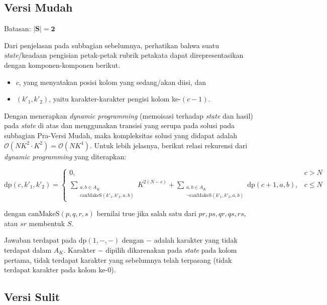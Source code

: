 \documentclass[../main_editorial.tex]{subfiles} %
\newcommand{\dpf}{\mathrm{dp}}
\newcommand{\mtrue}{\mathrm{true}}
\newcommand{\bigO}[1]{\mathcal{O}(#1)}
\begin{document}
\subsection*{Versi Mudah}
Batasan: $\mathbf{|S| = 2}$

Dari penjelasan pada subbagian sebelumnya, perhatikan bahwa suatu \textit{state}/keadaan pengisian petak-petak rubrik petakata dapat direpresentasikan dengan komponen-komponen berikut.

\begin{itemize}
\item $ c $, yang menyatakan posisi kolom yang sedang/akan diisi, dan
\item $ (k'_1, k'_2) $, yaitu karakter-karakter pengisi kolom ke-$ (c-1) $.
\end{itemize}

Dengan menerapkan \textit{dynamic programming} (memoisasi terhadap \textit{state} dan hasil) pada \textit{state} di atas dan menggunakan transisi yang serupa pada solusi pada subbagian Pra-Versi Mudah, maka kompleksitas solusi yang didapat adalah $ \bigO{NK^2 \cdot K^2} = \bigO{NK^4} $. Untuk lebih jelasnya, berikut relasi rekurensi dari \textit{dynamic programming} yang diterapkan:

$$
\dpf(c, k'_1, k'_2) = 
\begin{cases} 
	0, & c > N\\
	\displaystyle \sum_{\substack{a, b \in A_K\\\mathrm{canMakeS}(k'_1, k'_2, a, b)}} K^{2(N-c)} 
	+ \displaystyle \sum_{\substack{a, b \in A_K\\\lnot\mathrm{canMakeS}(k'_1, k'_2, a, b)}} \dpf(c + 1, a, b), & c \le N
\end{cases}
$$

dengan $ \mathrm{canMakeS}(p, q, r, s) $ bernilai $ \mtrue $ jika salah satu dari $ pr, ps, qr, qs, rs, $ atau $ sr $ membentuk $ S $.

Jawaban terdapat pada $ \dpf(1, -, -) $ dengan $ - $ adalah karakter yang tidak terdapat dalam $ A_K $. Karakter $ - $ dipilih dikarenakan pada \textit{state} pada kolom pertama, tidak terdapat karakter yang sebelumnya telah terpasang (tidak terdapat karakter pada kolom ke-$ 0 $).

\subsection*{Versi Sulit}
\end{document}
